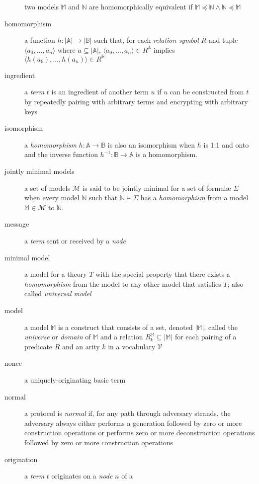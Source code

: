 \begin{description}
			two models $\mathbb{M}$ and $\mathbb{N}$ are homomorphically
			equivalent if $\mathbb{M} \preceq \mathbb{N} \wedge \mathbb{N}
			\preceq \mathbb{M}$
		\item[homomorphism]
			a function $h: |\mathbb{A}|\to|\mathbb{B}|$ such that, for each
			\emph{relation symbol} $R$ and tuple $\langle a_0 , \ldots , a_n
			\rangle$ where $a \subseteq |\mathbb{A}|$, $\langle a_0 , \ldots ,
			a_n \rangle \in R^\mathbb{A}$ implies $\langle h(a_0) , \ldots ,
			h(a_n) \rangle \in R^\mathbb{B}$
		\item[ingredient]
			a \emph{term} $t$ is an ingredient of another term $u$ if $u$ can
			be constructed from $t$ by repeatedly pairing with arbitrary terms
			and encrypting with arbitrary keys
		\item[isomorphism]
			a \emph{homomorphism} $h : \mathbb{A} \to \mathbb{B}$ is also an
			isomorphism when $h$ is 1:1 and onto and the inverse
			function $h^{-1} : \mathbb{B} \to \mathbb{A}$ is a homomorphism.
		\item[jointly minimal models]
			a set of models $\mathcal{M}$ is said to be jointly minimal
			for a set of formul{\ae} $\Sigma$ when every model $\mathbb{N}$
			such that $\mathbb{N} \models \Sigma$ has a \emph{homomorphism} from a
			model $\mathbb{M} \in \mathcal{M}$ to $\mathbb{N}$.
		\item[message]
			a \emph{term} sent or received by a \emph{node}
		\item[minimal model]
			a model for a theory $T$ with the special property that there exists
			a \emph{homomorphism} from the model to any other model that
			satisfies $T$; also called \emph{universal model}
		\item[model]
			a model $\mathbb{M}$ is a construct that consists of a set, denoted
			$|\mathbb{M}|$, called the \emph{universe} or \emph{domain} of
			$\mathbb{M}$ and a relation $R^\mathbb{M}_k \subseteq |\mathbb{M}|$
			for each pairing of a predicate $R$ and an arity $k$ in a vocabulary
			$\mathcal{V}$
		\item[nonce]
			a uniquely-originating basic term
		\item[normal]
			a protocol is \emph{normal} if, for any path through adversary
			strands, the adversary always either performs a generation followed
			by zero or more construction operations or performs zero or more
			deconstruction operations followed by zero or more construction
			operations
		\item[origination]
			a \emph{term} $t$ originates on a \emph{node} $n$ of a

\end{description}
